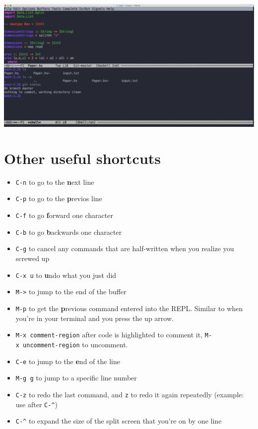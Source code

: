 \documentclass[12pt]{article}
\begin{document}
\begin{center}
\includegraphics[width=7in]{five}
\end{center}

\section{Other useful shortcuts}\label{other-useful-shortcuts}

\begin{itemize}
\item
  \texttt{C-n} to go to the \textbf{n}ext line
\item
  \texttt{C-p} to go to the \textbf{p}revios line
\item
  \texttt{C-f} to go \textbf{f}orward one character
\item
  \texttt{C-b} to go \textbf{b}ackwards one character
\item
  \texttt{C-g} to cancel any commands that are half-written when you
  realize you screwed up
\item
  \texttt{C-x\ u} to \textbf{u}ndo what you just did
\item
  \texttt{M-\textgreater{}} to jump to the end of the buffer
\item
  \texttt{M-p} to get the \textbf{p}revious command entered into the
  REPL. Similar to when you're in your terminal and you press the up
  arrow.
\item
  \texttt{M-x\ comment-region} after code is highlighted to comment it,
  \texttt{M-x\ uncomment-region} to uncomment.
\item
  \texttt{C-e} to jump to the \textbf{e}nd of the line
\item
  \texttt{M-g\ g} to jump to a specific line number
\item
  \texttt{C-z} to redo the last command, and \texttt{z} to redo it again
  repeatedly (example: use after \texttt{C-\^{}})
\item
  \texttt{C-\^{}} to expand the size of the split screen that you're on
  by one line
\end{itemize}
\end{document}
